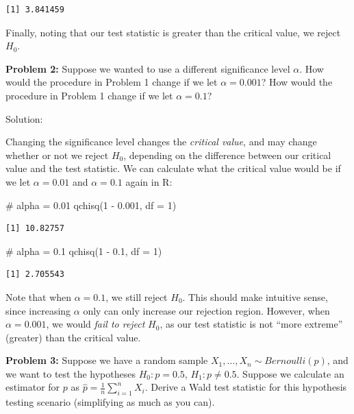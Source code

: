 \documentclass[
  letterpaper,
  DIV=11,
  numbers=noendperiod]{scrreprt}
\newenvironment{Shaded}{\begin{snugshade}}{\end{snugshade}}
\newcommand{\AttributeTok}[1]{\textcolor[rgb]{0.40,0.45,0.13}{#1}}
\newcommand{\CommentTok}[1]{\textcolor[rgb]{0.37,0.37,0.37}{#1}}
\newcommand{\DecValTok}[1]{\textcolor[rgb]{0.68,0.00,0.00}{#1}}
\newcommand{\FloatTok}[1]{\textcolor[rgb]{0.68,0.00,0.00}{#1}}
\newcommand{\FunctionTok}[1]{\textcolor[rgb]{0.28,0.35,0.67}{#1}}
\newcommand{\NormalTok}[1]{\textcolor[rgb]{0.00,0.23,0.31}{#1}}
\newcommand{\SpecialCharTok}[1]{\textcolor[rgb]{0.37,0.37,0.37}{#1}}
\begin{document}
\begin{verbatim}
[1] 3.841459
\end{verbatim}

Finally, noting that our test statistic is greater than the critical
value, we reject \(H_0\).

\textbf{Problem 2:} Suppose we wanted to use a different significance
level \(\alpha\). How would the procedure in Problem 1 change if we let
\(\alpha = 0.001\)? How would the procedure in Problem 1 change if we
let \(\alpha = 0.1\)?

Solution:

Changing the significance level changes the \emph{critical value}, and
may change whether or not we reject \(H_0\), depending on the difference
between our critical value and the test statistic. We can calculate what
the critical value would be if we let \(\alpha = 0.01\) and
\(\alpha = 0.1\) again in R:

\begin{Shaded}
\begin{Highlighting}[]
\CommentTok{\# alpha = 0.01}
\FunctionTok{qchisq}\NormalTok{(}\DecValTok{1} \SpecialCharTok{{-}} \FloatTok{0.001}\NormalTok{, }\AttributeTok{df =} \DecValTok{1}\NormalTok{)}
\end{Highlighting}
\end{Shaded}

\begin{verbatim}
[1] 10.82757
\end{verbatim}

\begin{Shaded}
\begin{Highlighting}[]
\CommentTok{\# alpha = 0.1}
\FunctionTok{qchisq}\NormalTok{(}\DecValTok{1} \SpecialCharTok{{-}} \FloatTok{0.1}\NormalTok{, }\AttributeTok{df =} \DecValTok{1}\NormalTok{)}
\end{Highlighting}
\end{Shaded}

\begin{verbatim}
[1] 2.705543
\end{verbatim}

Note that when \(\alpha = 0.1\), we still reject \(H_0\). This should
make intuitive sense, since increasing \(\alpha\) only can only increase
our rejection region. However, when \(\alpha = 0.001\), we would
\emph{fail to reject} \(H_0\), as our test statistic is not ``more
extreme'' (greater) than the critical value.

\textbf{Problem 3:} Suppose we have a random sample
\(X_1, \dots, X_n \sim Bernoulli(p)\), and we want to test the
hypotheses \(H_0:p = 0.5\), \(H_1:p \neq 0.5\). Suppose we calculate an
estimator for \(p\) as \(\hat{p} = \frac{1}{n} \sum_{i = 1}^n X_i\).
Derive a Wald test statistic for this hypothesis testing scenario
(simplifying as much as you can).
\end{document}
